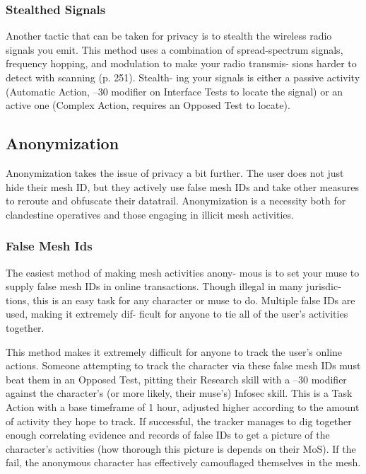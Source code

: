 \subsubsection{Stealthed Signals}

Another tactic that can be taken for privacy is to stealth 
the wireless radio signals you emit. This method uses 
a combination of spread-spectrum signals, frequency 
hopping, and modulation to make your radio transmis-
sions harder to detect with scanning (p. 251). Stealth-
ing your signals is either a passive activity (Automatic 
Action, –30 modifier on Interface Tests to locate the 
signal) or an active one (Complex Action, requires an 
Opposed Test to locate).

\subsection{Anonymization}

Anonymization takes the issue of privacy a bit further. 
The user does not just hide their mesh ID, but they 
actively use false mesh IDs and take other measures to 
reroute and obfuscate their datatrail. Anonymization 
is a necessity both for clandestine operatives and those 
engaging in illicit mesh activities.

\subsubsection{False Mesh Ids}

The easiest method of making mesh activities anony-
mous is to set your muse to supply false mesh IDs in 
online transactions. Though illegal in many jurisdic-
tions, this is an easy task for any character or muse to 
do. Multiple false IDs are used, making it extremely dif-
ficult for anyone to tie all of the user's activities together.

This method makes it extremely difficult for anyone 
to track the user's online actions. Someone attempting 
to track the character via these false mesh IDs must 
beat them in an Opposed Test, pitting their Research 
skill with a –30 modifier against the character's (or 
more likely, their muse's) Infosec skill. This is a Task 
Action with a base timeframe of 1 hour, adjusted 
higher according to the amount of activity they hope 
to track. If successful, the tracker manages to dig 
together enough correlating evidence and records of 
false IDs to get a picture of the character's activities 
(how thorough this picture is depends on their MoS). 
If the fail, the anonymous character has effectively 
camouflaged themselves in the mesh.

